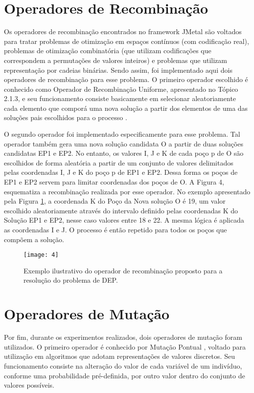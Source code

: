 \section{Operadores de Recombinação}
\label{ch:3_OperadorRecombinacao}
Os operadores de recombinação encontrados no framework JMetal são voltados para tratar problemas de otimização em espaços contínuos (com codificação real), problemas de otimização combinatória (que utilizam codificações que correspondem a permutações de valores inteiros) e problemas que utilizam representação por cadeias binárias. Sendo assim, foi implementado aqui dois operadores de recombinação para esse problema. O primeiro operador escolhido é conhecido como Operador de Recombinação Uniforme, apresentado no Tópico 2.1.3, e seu funcionamento consiste basicamente em selecionar aleatoriamente cada elemento que comporá uma nova solução a partir dos elementos de uma das soluções pais escolhidos para o processo \cite{Talbi2009, Kacprzyk2015}.

O segundo operador foi implementado especificamente para esse problema.  Tal operador também gera uma nova solução candidata O a partir de duas soluções candidatas EP1 e EP2. No entanto, os valores I, J e K de cada poço p de O são escolhidos de forma aleatória a partir de um conjunto de valores delimitados pelas coordenadas I, J e K do poço p de EP1 e EP2. Dessa forma os poços de EP1 e EP2 servem para limitar coordenadas dos poços de O. A Figura 4, esquematiza a recombinação realizada por esse operador. No exemplo apresentado pela Figura \ref{fig:fig3_2}, a coordenada K do Poço da Nova solução O é 19, um valor escolhido aleatoriamente através do intervalo definido pelas coordenadas K do Solução EP1 e EP2, nesse caso valores entre 18 e 22. A mesma lógica é aplicada as coordenadas I e J. O processo é então repetido para todos os poços que compõem a solução.

\begin{figure}[htb]
  \centering
  \texttt{[image: 4]}
  \caption{Exemplo ilustrativo do operador de recombinação proposto para a resolução do problema de DEP.}
  \label{fig:fig3_2}
\end{figure}

\section{Operadores de Mutação}
\label{ch:3_OperadorMutacao}
Por fim, durante os experimentos realizados, dois operadores de mutação foram utilizados. O primeiro operador é conhecido por Mutação Pontual \cite{Kacprzyk2015}, voltado para utilização em algoritmos que adotam representações de valores discretos. Seu funcionamento consiste na alteração do valor de cada variável de um indivíduo, conforme uma probabilidade pré-definida, por outro valor dentro do conjunto de valores possíveis.


